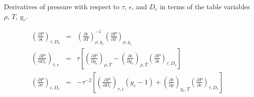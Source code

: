 Derivatives of pressure with respect to $\tau$, $\epsilon$, and $D_{e}$
in terms of the table variables $\rho$, $T$, $y_e$. \\
\begin{footnotesize}
\begin{eqnarray}
	\left(\frac{\partial{P}}{\partial{\epsilon}}\right)_{\tau,D_{e}} &=& \left(\frac{\partial{\epsilon}}{\partial{T}}\right)^{-1}_{\rho, y_{e}}\left(\frac{\partial{P}}{\partial{T}}\right)_{\rho, y_{e}} \\
	\left(\frac{\partial{P}}{\partial{D_{e}}}\right)_{\tau, \epsilon} &=& \tau \left[
					\left(\frac{\partial{P}}{\partial{y_e}}\right)_{\rho, T} -
          \left(\frac{\partial{\epsilon}}{\partial{y_e}}\right)_{\rho, T}
					\left(\frac{\partial{P}}{\partial{\epsilon}}\right)_{\tau, D_{e}}\right]\\
	\left(\frac{\partial{P}}{\partial{\tau}}\right)_{\epsilon, D_{e}} &=& -\tau^{-2}
					\left[ \left(\frac{\partial{P}}{\partial{D_{e}}}\right)_{\tau, \epsilon}
					(y_e - 1) + \left( \frac{\partial{\epsilon}}{\partial{\rho}} \right)_{y_{e}, T}
          \left(\frac{\partial{P}}{\partial{\epsilon}}\right)_{\tau, D_{e}}\right]
\end{eqnarray}
\end{footnotesize}

